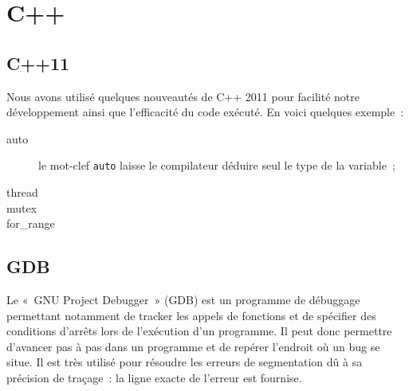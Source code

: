 \section{C++}

\subsection{C++11}
Nous avons utilisé quelques nouveautés de C++ 2011 pour facilité notre développement ainsi que l'efficacité du code exécuté. En voici quelques exemple~:
\begin{description}
\item[auto] le mot-clef \verb|auto| laisse le compilateur déduire seul le type de la variable~;
\item[thread]
\item[mutex]
\item[for\_range]
\end{description}

\subsection{GDB}
Le «~GNU Project Debugger~» (GDB) est un programme de débuggage permettant notamment de tracker les appels de fonctions et de spécifier des conditions d'arrêts lors de l'exécution d'un programme. Il peut donc permettre d'avancer pas à pas dans un programme et de repérer l'endroit où un bug se situe. Il est très utilisé pour résoudre les erreurs de segmentation dû à sa précision de traçage~: la ligne exacte de l'erreur est fournise.
